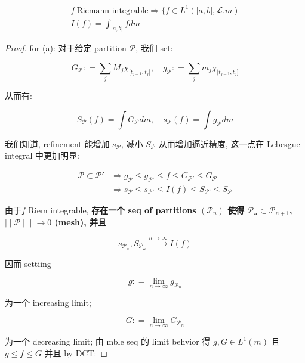 \begin{theorem}{}

\[\begin{matrix}
{f\ \text{Riemann integrable}\Longrightarrow\{ f \in L^{1}(\lbrack a,b\rbrack,\mathcal{L}.m)} \\
{I(f) = \int_{\lbrack a,b\rbrack}f dm}
\end{matrix}\]

\end{theorem}

\begin{proof}

for (a): 对于给定 partition \(\mathcal{P}\), 我们 set:

\[G_{\mathcal{P}}: = \sum\limits_{j}M_{j}\chi_{\lbrack t_{j - 1},t_{j}\rbrack},\quad g_{\mathcal{P}}: = \sum\limits_{j}m_{j}\chi_{\lbrack t_{j - 1},t_{j}\rbrack}\]

从而有:

\[S_{\mathcal{P}}(f) = \int G_{\mathcal{P}} dm,\quad s_{\mathcal{P}}(f) = \int g_{\mathcal{P}} dm\]

我们知道, refinement 能增加 \(s_{\mathcal{P}}\), 减小 \(S_{\mathcal{P}}\) 从而增加逼近精度, 这一点在 Lebesgue integral 中更加明显:

\[\begin{matrix}
{\mathcal{P} \subset \mathcal{P}'} & {\Longrightarrow g_{\mathcal{P}} \leq g_{\mathcal{P}'} \leq f \leq G_{\mathcal{P}'} \leq G_{\mathcal{P}}} \\
 & {\Longrightarrow s_{\mathcal{P}} \leq s_{\mathcal{P}'} \leq I(f) \leq S_{\mathcal{P}'} \leq S_{\mathcal{P}}}
\end{matrix}\]

由于\(f\) Riem integrable, \textbf{存在一个 seq of partitions \((\mathcal{P}_{n})\) 使得 \(\mathcal{P}_{\mathcal{n}} \subset \mathcal{P}_{n + 1}\), \(\left. | \middle| \mathcal{P} \middle| \middle| \rightarrow 0 \right.\) (mesh), 并且}

\[s_{\mathcal{P}_{\mathcal{n}}},S_{\mathcal{P}_{\mathcal{n}}}\overset{n\rightarrow\infty}{\rightarrow}I(f)\]

因而 settiing

\[g: = \lim\limits_{n\rightarrow\infty}g_{\mathcal{P}_{n}}\]

为一个 increasing limit;

\[G: = \lim\limits_{n\rightarrow\infty}G_{\mathcal{P}_{n}}\]

为一个 decreasing limit; 由 mble seq 的 limit behvior 得 \(g,G \in L^{1}(m)\) 且 \(g \leq f \leq G\) 并且 by DCT:


\end{proof}
